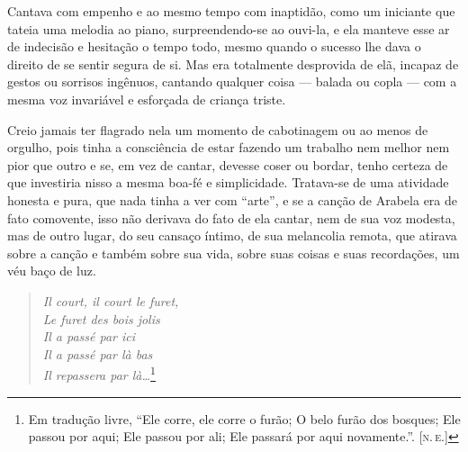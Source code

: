 Cantava com empenho e ao mesmo tempo com inaptidão, como um iniciante
que tateia uma melodia ao piano, surpreendendo-se ao ouvi-la, e ela
manteve esse ar de indecisão e hesitação o tempo todo, mesmo quando o
sucesso lhe dava o direito de se sentir segura de si. Mas era totalmente
desprovida de elã, incapaz de gestos ou sorrisos ingênuos, cantando
qualquer coisa --- balada ou copla --- com a mesma voz invariável e
esforçada de criança triste.

Creio jamais ter flagrado nela um momento de cabotinagem ou ao menos de
orgulho, pois tinha a consciência de estar fazendo um trabalho nem
melhor nem pior que outro e se, em vez de cantar, devesse coser ou
bordar, tenho certeza de que investiria nisso a mesma boa-fé e
simplicidade. Tratava-se de uma atividade honesta e pura, que nada tinha
a ver com ``arte'', e se a canção de Arabela era de fato comovente, isso
não derivava do fato de ela cantar, nem de sua voz modesta, mas de outro
lugar, do seu cansaço íntimo, de sua melancolia remota, que atirava
sobre a canção e também sobre sua vida, sobre suas coisas e suas
recordações, um véu baço de luz.


\begin{verse}
\emph{Il court, il court le furet,}\\
\emph{Le furet des bois jolis}\\
\emph{Il a passé par ici}\\
\emph{Il a passé par là bas}\\
\emph{Il repassera par là\ldots{}}\footnote{Em tradução livre, ``Ele corre, ele corre o furão; O belo furão dos bosques; Ele passou por aqui; Ele passou por ali; Ele passará por aqui novamente.''. \textsc{{[}n.\,e.{]}}}
\end{verse}


